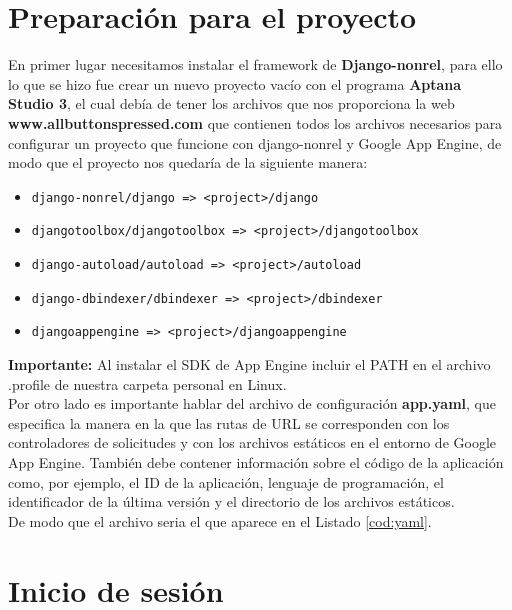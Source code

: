 \section{Preparación para el proyecto}
\label{4:sec3}

En primer lugar necesitamos instalar el framework de \textbf{Django-nonrel}, para ello lo que se hizo fue crear un nuevo proyecto vacío con el 
programa \textbf{Aptana Studio 3}, el cual debía de tener los archivos que nos proporciona la web \textbf{www.allbuttonspressed.com} \cite{URL:DjangoNonrel} que contienen 
todos los archivos necesarios para configurar un proyecto que funcione con django-nonrel y Google App Engine, 
de modo que el proyecto nos quedaría de la siguiente manera:

\begin{itemize}
  \item \lstinline!django-nonrel/django => <project>/django!
  \item \lstinline!djangotoolbox/djangotoolbox => <project>/djangotoolbox!
  \item \lstinline!django-autoload/autoload => <project>/autoload!
  \item \lstinline!django-dbindexer/dbindexer => <project>/dbindexer!
  \item \lstinline!djangoappengine => <project>/djangoappengine!
\end{itemize}

\textbf{Importante:} Al instalar el SDK de App Engine incluir el PATH en el archivo .profile de nuestra carpeta personal en Linux.\\

Por otro lado es importante hablar del archivo de configuración \textbf{app.yaml}, que especifica la manera en la que las rutas de URL se corresponden con los 
controladores de solicitudes y con los archivos estáticos en el entorno de Google App Engine. 
También debe contener información sobre el código de la aplicación como, por ejemplo, el ID de la aplicación, lenguaje de programación, el identificador de la última versión y el directorio de los archivos estáticos.\\

De modo que el archivo seria el que aparece en el Listado \ref{cod:yaml}.\\



\section{Inicio de sesión}
\label{4:sec4}

